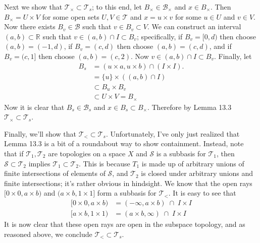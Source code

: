 \documentclass[11pt]{article}
\begin{document}
\begin{solution}
  Next we show that $\mathcal{T}_\times \subset \mathcal{T}_s$; to this end, let
  $B_\times \in \mathcal{B}_\times$ and $x \in B_\times$. Then $B_\times = U \times V$ for some open
  sets $U, V \in \mathcal{T}$ and $x = u \times v$ for some $u \in U$ and $v \in
  V$. Now there exists $B_v \in \mathcal{B}$ such that $v \in B_v \subset V$. We
  can construct an interval $(a,b) \subset \mathbb{R}$ such that $v \in (a,
  b) \cap I \subset B_v$; specifically, if $B_v = [0, d)$ then choose
  $(a, b) = (-1, d)$, if $B_v = (c, d)$ then choose $(a, b) = (c, d)$, and if
  $B_v = (c, 1]$ then choose $(a, b) = (c, 2)$. Now $v \in (a, b) \cap I
  \subset B_v$. Finally, let
  \begin{align*}
    B_s &= (u \times a, u \times b) \cap (I \times I).\\
        &= \{u\} \times ((a, b) \cap I) \\
        &\subset B_u \times B_v \\
        &\subset U \times V = B_\times
  \end{align*}
  Now it is clear that $B_s \in \mathcal{B}_s$ and $x \in B_s \subset B_\times$.
  Therefore by Lemma 13.3 $\mathcal{T}_\times \subset \mathcal{T}_s$.

  Finally, we'll show that $\mathcal{T}_< \subset \mathcal{T}_s$. Unfortunately, I've only just
  realized that Lemma 13.3 is a bit of a roundabout way to show containment.
  Instead, note that if $\mathcal{T}_1, \mathcal{T}_2$ are topologies on a space
  $X$ and $\mathcal{S}$ is a subbasis for $\mathcal{T}_1$, then $\mathcal{S}
  \subset \mathcal{T}_2$ implies $\mathcal{T}_1 \subset \mathcal{T}_2$. This is
  because $T_1$ is made up of arbitrary unions of finite intersections of
  elements of $\mathcal{S}$, and $\mathcal{T}_2$ is closed under arbitrary
  unions and finite intersections; it's rather obvious in hindsight. We know
  that the open rays $[0 \times
  0, a \times b)$ and $(a \times b, 1 \times 1]$ form a subbasis for
  $\mathcal{T}_<$. It is easy to see that
  \begin{align*}
    [0 \times 0, a \times b) &= (-\infty, a \times b) \;\cap\; I \times I \\
    [a \times b, 1 \times 1) &= (a \times b, \infty) \;\cap\; I \times I
  \end{align*}
  It is now clear that these open rays are open in the subspace topology, and
  as reasoned above, we conclude $\mathcal{T}_< \subset \mathcal{T}_s$.

\end{solution}
\end{document}
